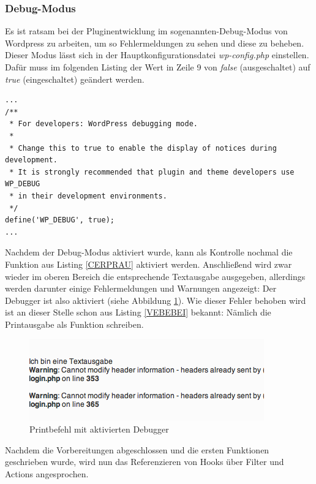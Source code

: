 \subsubsection{Debug-Modus}\label{subsub_debmod}
Es ist ratsam bei der Pluginentwicklung
 im sogenannten-Debug-Modus von Wordpress zu arbeiten, um so  Fehlermeldungen zu sehen und diese zu beheben.
Dieser Modus lässt sich in der Hauptkonfigurationsdatei \emph{wp-config.php} einstellen. Dafür muss im folgenden Listing der Wert in Zeile 9 von \emph{false} (ausgeschaltet) auf \emph{true} (eingeschaltet) geändert werden.
\begin{lstlisting}
...
/**
 * For developers: WordPress debugging mode.
 *
 * Change this to true to enable the display of notices during development.
 * It is strongly recommended that plugin and theme developers use WP_DEBUG
 * in their development environments.
 */
define('WP_DEBUG', true);
...
\end{lstlisting} 
Nachdem der Debug-Modus aktiviert wurde, kann als Kontrolle nochmal die Funktion aus Listing \ref{CERPRAU} aktiviert werden. Anschließend wird zwar wieder im oberen Bereich die entsprechende Textausgabe ausgegeben, allerdings werden darunter einige Fehlermeldungen und Warnungen angezeigt: Der Debugger ist also aktiviert (siehe Abbildung \ref{img:PRMAKDE}). \newline
Wie dieser Fehler behoben wird ist an dieser Stelle schon aus Listing \ref{VEBEBEI} bekannt: Nämlich die Printausgabe als Funktion schreiben.\newline
 \begin{figure}[htbp]
	\begin{center}
		\includegraphics[angle={360}, scale=0.61]{pictures/printheadermeldung.png}
	    \caption{Printbefehl mit aktivierten Debugger}
	    \label{img:PRMAKDE}
	    	\end{center}
   \end{figure}\newline
Nachdem die Vorbereitungen abgeschlossen und die ersten Funktionen geschrieben wurde, wird nun das Referenzieren von Hooks über Filter und Actions angesprochen. 
